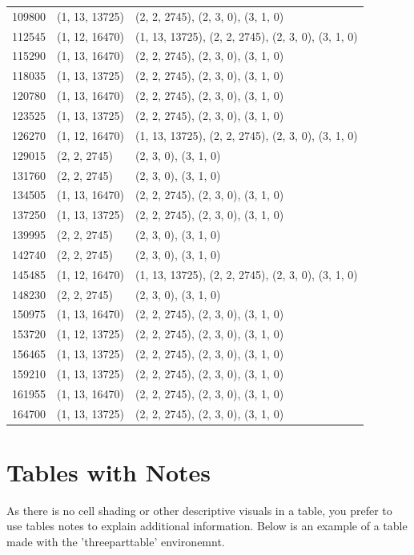 \documentclass[../main.tex]{subfiles}
\begin{document}
\begin{longtable}[h!t!]{p{0.6in}p{1in}p{4.4in}}
109800 & (1, 13, 13725) & (2, 2, 2745), (2, 3, 0), (3, 1, 0) \\
112545 & (1, 12, 16470) & (1, 13, 13725), (2, 2, 2745), (2, 3, 0), (3, 1, 0) \\
115290 & (1, 13, 16470) & (2, 2, 2745), (2, 3, 0), (3, 1, 0) \\
118035 & (1, 13, 13725) & (2, 2, 2745), (2, 3, 0), (3, 1, 0) \\
120780 & (1, 13, 16470) & (2, 2, 2745), (2, 3, 0), (3, 1, 0) \\
123525 & (1, 13, 13725) & (2, 2, 2745), (2, 3, 0), (3, 1, 0) \\
126270 & (1, 12, 16470) & (1, 13, 13725), (2, 2, 2745), (2, 3, 0), (3, 1, 0) \\
129015 & (2, 2, 2745) & (2, 3, 0), (3, 1, 0) \\
131760 & (2, 2, 2745) & (2, 3, 0), (3, 1, 0) \\
134505 & (1, 13, 16470) & (2, 2, 2745), (2, 3, 0), (3, 1, 0) \\
137250 & (1, 13, 13725) & (2, 2, 2745), (2, 3, 0), (3, 1, 0) \\
139995 & (2, 2, 2745) & (2, 3, 0), (3, 1, 0) \\
142740 & (2, 2, 2745) & (2, 3, 0), (3, 1, 0) \\
145485 & (1, 12, 16470) & (1, 13, 13725), (2, 2, 2745), (2, 3, 0), (3, 1, 0)\\%
148230 & (2, 2, 2745) & (2, 3, 0), (3, 1, 0) \\
150975 & (1, 13, 16470) & (2, 2, 2745), (2, 3, 0), (3, 1, 0) \\
153720 & (1, 12, 13725) & (2, 2, 2745), (2, 3, 0), (3, 1, 0) \\
156465 & (1, 13, 13725) & (2, 2, 2745), (2, 3, 0), (3, 1, 0) \\
159210 & (1, 13, 13725) & (2, 2, 2745), (2, 3, 0), (3, 1, 0) \\
161955 & (1, 13, 16470) & (2, 2, 2745), (2, 3, 0), (3, 1, 0) \\
164700 & (1, 13, 13725) & (2, 2, 2745), (2, 3, 0), (3, 1, 0) \\
\end{longtable}

\section{Tables with Notes}

As there is no cell shading or other descriptive visuals in a table, you prefer to use tables notes to explain additional information. Below is an example of a table made with the 'threeparttable' environemnt. 
\end{document}
